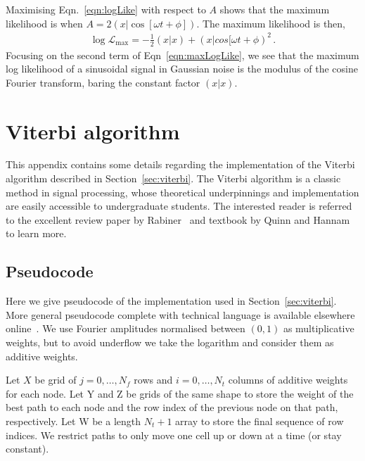 \documentclass[paper-main.tex]{subfiles}
\begin{document}
Maximising Eqn.~\ref{eqn:logLike} with respect to $A$ shows that the maximum likelihood is when $A = 2\left( x | \cos[\omega t+\phi]\right)$. 
The maximum likelihood is then, 
\begin{eqnarray}
\log \mathcal{L}_\mathrm{max} = - \frac{1}{2} (x|x) + ( x | cos[\omega t + \phi)^2\,. \label{eqn:maxLogLike}
\end{eqnarray}
Focusing on the second term of Eqn~\ref{eqn:maxLogLike}, we see that the maximum log likelihood of a sinusoidal signal in Gaussian noise is the modulus of the cosine Fourier transform, baring the constant factor $(x|x)$.  




\section{Viterbi algorithm}
\label{app:viterbi}

This appendix contains some details regarding the implementation of the Viterbi algorithm described in Section~\ref{sec:viterbi}. 
The Viterbi algorithm is a classic method in signal processing, whose theoretical underpinnings and implementation are easily accessible to undergraduate students. 
The interested reader is referred to the excellent review paper by Rabiner~\cite{Rabiner:1989} and textbook by Quinn and Hannam~\cite{QuinnEtAl:2001} to learn more. 

\subsection{Pseudocode}
Here we give pseudocode of the implementation used in Section~\ref{sec:viterbi}. More general pseudocode complete with technical language is available elsewhere online~\cite{viterbipseudocode:online}. We use Fourier amplitudes normalised between $(0, 1)$ as multiplicative weights, but to avoid underflow we take the logarithm and consider them as additive weights.

Let $X$ be grid of $j=0,\ldots,N_f$ rows and $i=0,\ldots,N_t$ columns of additive weights for each node. Let Y and Z be grids of the same shape to store the weight of the best path to each node and the row index of the previous node on that path, respectively. Let W be a length $N_t+1$ array to store the final sequence of row indices. We restrict paths to only move one cell up or down at a time (or stay constant).
\end{document}
